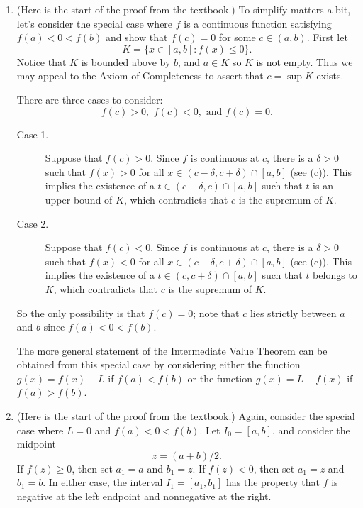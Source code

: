 \documentclass{lew98_solutions}
\begin{document}
\begin{solution}
    \begin{enumerate}
        \item (Here is the start of the proof from the textbook.) To simplify matters a bit, let's consider the special case where \( f \) is a continuous function satisfying \( f(a) < 0 < f(b) \) and show that \( f(c) = 0 \) for some \( c \in (a, b) \). First let
        \[
            K = \{ x \in [a, b] : f(x) \leq 0 \}.
        \]
        Notice that \( K \) is bounded above by \( b \), and \( a \in K \) so \( K \) is not empty. Thus we may appeal to the Axiom of Completeness to assert that \( c = \sup K \) exists.

        There are three cases to consider:
        \[
            f(c) > 0, \,\, f(c) < 0, \text{  and  } f(c) = 0.
        \]
        \begin{description}
            \item[Case 1.] Suppose that \( f(c) > 0 \). Since \( f \) is continuous at \( c \), there is a \( \delta > 0 \) such that \( f(x) > 0 \) for all \( x \in (c - \delta, c + \delta) \cap [a, b] \) (see  (c)). This implies the existence of a \( t \in (c - \delta, c) \cap [a, b] \) such that \( t \) is an upper bound of \( K \), which contradicts that \( c \) is the supremum of \( K \).

            \item[Case 2.] Suppose that \( f(c) < 0 \). Since \( f \) is continuous at \( c \), there is a \( \delta > 0 \) such that \( f(x) < 0 \) for all \( x \in (c - \delta, c + \delta) \cap [a, b] \) (see  (c)). This implies the existence of a \( t \in (c, c + \delta) \cap [a, b] \) such that \( t \) belongs to \( K \), which contradicts that \( c \) is the supremum of \( K \).
        \end{description}
        So the only possibility is that \( f(c) = 0 \); note that \( c \) lies strictly between \( a \) and \( b \) since \( f(a) < 0 < f(b) \).

        The more general statement of the Intermediate Value Theorem can be obtained from this special case by considering either the function \( g(x) = f(x) - L \) if \( f(a) < f(b) \) or the function \( g(x) = L - f(x) \) if \( f(a) > f(b) \).

        \item (Here is the start of the proof from the textbook.) Again, consider the special case where \( L = 0 \) and \( f(a) < 0 < f(b) \). Let \( I_0 = [a, b] \), and consider the midpoint
        \[
            z = (a + b)/2.
        \]
        If \( f(z) \geq 0 \), then set \( a_1 = a \) and \( b_1 = z \). If \( f(z) < 0 \), then set \( a_1 = z \) and \( b_1 = b \). In either case, the interval \( I_1 = [a_1, b_1] \) has the property that \( f \) is negative at the left endpoint and nonnegative at the right. 


\end{enumerate}
\end{solution}
\end{document}
